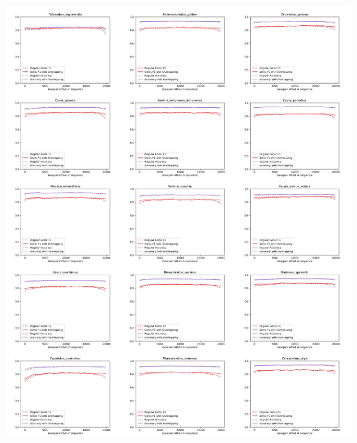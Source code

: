\documentclass{article}
\begin{document}
\begin{figure}[!h]
\centerline{\includegraphics[width=\overlapscale\textwidth]{images/overlapping/montage_animals6}}
\end{figure}
\end{document}
